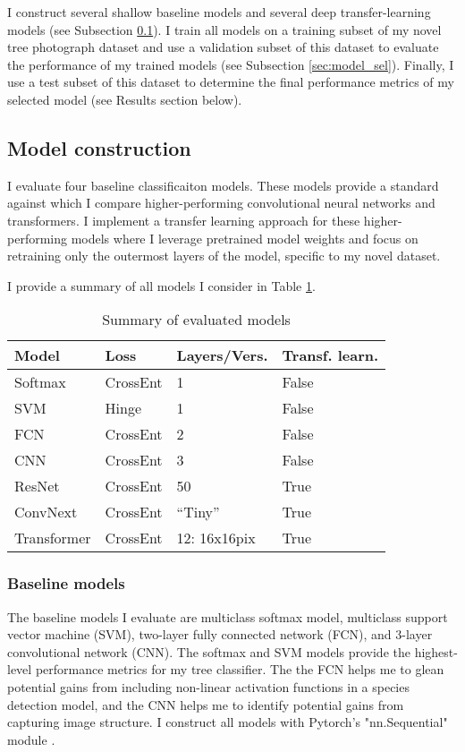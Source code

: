 \documentclass[10pt,twocolumn,letterpaper]{article}
\begin{document}
I construct several shallow baseline models and several deep transfer-learning models (see Subsection \ref{sec:models}). I train all models on a training subset of my novel tree photograph dataset and use a validation subset of this dataset to evaluate the performance of my trained models (see Subsection \ref{sec:model_sel}). Finally, I use a test subset of this dataset to determine the final performance metrics of my selected model (see Results section below).  

\subsection{Model construction}
\label{sec:models}
I evaluate four baseline classificaiton models. These models provide a standard against which I compare higher-performing convolutional neural networks and transformers. I implement a transfer learning approach for these higher-performing models where I leverage pretrained model weights and focus on retraining only the outermost layers of the model, specific to my novel dataset.

I provide a summary of all models I consider in Table \ref{tab:model_desc}.

\begin{table}[!htbp]
  \begin{center}
    \small
  \begin{tabular}{|l|l|l|l|}
  \hline
  Model & Loss & Layers/Vers. & Transf. learn.\\
  \hline\hline
  Softmax & CrossEnt & 1 & False \\
  SVM & Hinge & 1 & False \\
  FCN & CrossEnt & 2 & False \\
  CNN & CrossEnt & 3 & False \\
  ResNet & CrossEnt & 50 & True \\
  ConvNext & CrossEnt & ``Tiny'' & True \\
  Transformer & CrossEnt & 12: 16x16pix & True \\
  \hline
  \end{tabular}
  \end{center}
  \caption{\label{tab:model_desc} Summary of evaluated models}
  \end{table}

\subsubsection{Baseline models}
The baseline models I evaluate are multiclass softmax model, multiclass support vector machine (SVM), two-layer fully connected network (FCN), and 3-layer convolutional network (CNN). The softmax and SVM models provide the highest-level performance metrics for my tree classifier. The the FCN helps me to glean potential gains from including non-linear activation functions in a species detection model, and the CNN helps me to identify potential gains from capturing image structure. I construct all models with Pytorch's "nn.Sequential" module \cite{PyTorch}.
\end{document}
